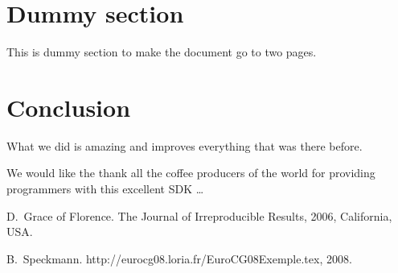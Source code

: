 \documentclass{gts2012}
\begin{document}
\section{Dummy section}
This is dummy section to make the document go to two pages.

\section{Conclusion}

What we did is amazing and improves everything that was there before.


\begin{acknowledgments}
  We would like the thank all the coffee producers of the world for
  providing programmers with this excellent SDK \ldots
\end{acknowledgments}




\footnotesize 


\begin{thebibliography}{99}

D.~Grace of Florence.
\newblock The Journal of Irreproducible Results, 2006, California, USA.

B.~Speckmann.
\newblock http://eurocg08.loria.fr/EuroCG08Exemple.tex, 2008.

\end{thebibliography}
\end{document}
